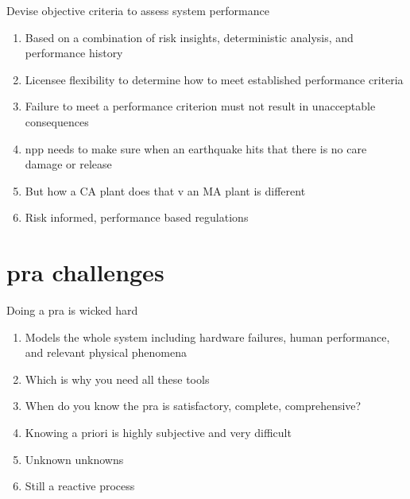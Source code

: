 \documentclass[aspectratio=1610,pdftex,dvipsnames,compress,xcolor={dvipsnames}]{beamer}
\newcommand{\acs}{\acrshort} %
\begin{document}
\begin{frame}{Devise objective criteria to assess system performance }
    \begin{enumerate}[series=outerlist,topsep=0pt,itemsep=17pt,leftmargin=*,label=(\arabic*)]
        \item[]Based on a combination of risk insights, deterministic analysis, and performance history  
        \item[]Licensee flexibility to determine how to meet established performance criteria
        \item[]Failure to meet a performance criterion must not result in unacceptable consequences
        \item[]\acs{npp} needs to make sure when an earthquake hits that there is no care damage or release  
        \item[]But how a CA plant does that v an MA plant is different
        \item[]Risk informed, performance based regulations 
    \end{enumerate}
\end{frame}


\section{\acs{pra} challenges}


\addtocounter{framenumber}{-1}
\begin{frame}{Doing a \acs{pra} is wicked hard}
    \begin{enumerate}[series=outerlist,topsep=0pt,itemsep=17pt,leftmargin=*,label=(\arabic*)]
        \item[]Models the whole system including hardware failures, human performance, and relevant physical phenomena
        \item[]Which is why you need all these tools
        \item[]When do you know the \acs{pra} is satisfactory, complete, comprehensive?
        \item[]Knowing a priori is highly subjective and very difficult
        \item[]Unknown unknowns
        \item[]Still a reactive process
    \end{enumerate}
\end{frame}
\end{document}
